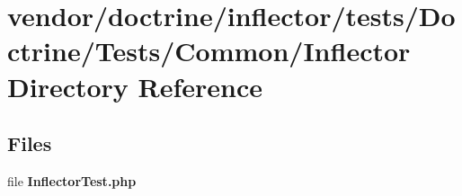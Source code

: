 \section{vendor/doctrine/inflector/tests/\+Doctrine/\+Tests/\+Common/\+Inflector Directory Reference}
\label{dir_9a43b727e5f337a2bc50e2fe96071514}
\subsection*{Files}
\begin{DoxyCompactItemize}
\item 
file {\bf Inflector\+Test.\+php}
\end{DoxyCompactItemize}

